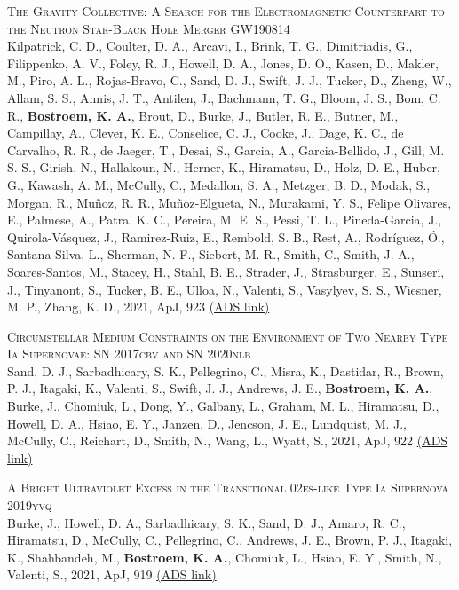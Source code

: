 \begin{revnumerate}[67]
    \item{\textsc{The Gravity Collective: A Search for the Electromagnetic Counterpart to the Neutron Star-Black Hole Merger GW190814}\\ 
    Kilpatrick, C. D., Coulter, D. A., Arcavi, I., Brink, T. G., Dimitriadis, G., Filippenko, A. V., Foley, R. J., Howell, D. A., Jones, D. O., Kasen, D., Makler, M., Piro, A. L., Rojas-Bravo, C., Sand, D. J., Swift, J. J., Tucker, D., Zheng, W., Allam, S. S., Annis, J. T., Antilen, J., Bachmann, T. G., Bloom, J. S., Bom, C. R., \textbf{Bostroem, K. A.}, Brout, D., Burke, J., Butler, R. E., Butner, M., Campillay, A., Clever, K. E., Conselice, C. J., Cooke, J., Dage, K. C., de Carvalho, R. R., de Jaeger, T., Desai, S., Garcia, A., Garcia-Bellido, J., Gill, M. S. S., Girish, N., Hallakoun, N., Herner, K., Hiramatsu, D., Holz, D. E., Huber, G., Kawash, A. M., McCully, C., Medallon, S. A., Metzger, B. D., Modak, S., Morgan, R., Mu\~{n}oz, R. R., Mu\~{n}oz-Elgueta, N., Murakami, Y. S., Felipe Olivares, E., Palmese, A., Patra, K. C., Pereira, M. E. S., Pessi, T. L., Pineda-Garcia, J., Quirola-V\'{a}squez, J., Ramirez-Ruiz, E., Rembold, S. B., Rest, A., Rodríguez, Ó., Santana-Silva, L., Sherman, N. F., Siebert, M. R., Smith, C., Smith, J. A., Soares-Santos, M., Stacey, H., Stahl, B. E., Strader, J., Strasburger, E., Sunseri, J., Tinyanont, S., Tucker, B. E., Ulloa, N., Valenti, S., Vasylyev, S. S., Wiesner, M. P., Zhang, K. D., 2021, ApJ, 923 
    \color{blue}\href{https://ui.adsabs.harvard.edu/abs/2021ApJ...923..258K}{(ADS link)}\color{black}}\\
    
    \item{\textsc{Circumstellar Medium Constraints on the Environment of Two Nearby Type Ia Supernovae: SN 2017cbv and SN 2020nlb}\\ 
    Sand, D. J., Sarbadhicary, S. K., Pellegrino, C., Misra, K., Dastidar, R., Brown, P. J., Itagaki, K., Valenti, S., Swift, J. J., Andrews, J. E., \textbf{Bostroem, K. A.}, Burke, J., Chomiuk, L., Dong, Y., Galbany, L., Graham, M. L., Hiramatsu, D., Howell, D. A., Hsiao, E. Y., Janzen, D., Jencson, J. E., Lundquist, M. J., McCully, C., Reichart, D., Smith, N., Wang, L., Wyatt, S., 2021, ApJ, 922 
    \color{blue}\href{https://ui.adsabs.harvard.edu/abs/2021ApJ...922...21S}{(ADS link)}\color{black}}\\
    
    \item{\textsc{A Bright Ultraviolet Excess in the Transitional 02es-like Type Ia Supernova 2019yvq}\\ 
    Burke, J., Howell, D. A., Sarbadhicary, S. K., Sand, D. J., Amaro, R. C., Hiramatsu, D., McCully, C., Pellegrino, C., Andrews, J. E., Brown, P. J., Itagaki, K., Shahbandeh, M., \textbf{Bostroem, K. A.}, Chomiuk, L., Hsiao, E. Y., Smith, N., Valenti, S., 2021, ApJ, 919 
    \color{blue}\href{https://ui.adsabs.harvard.edu/abs/2021ApJ...919..142B}{(ADS link)}\color{black}}\\
    

\end{revnumerate}
